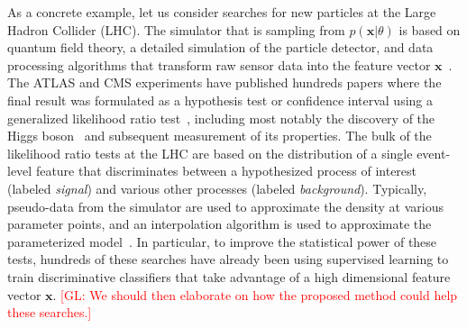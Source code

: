 \documentclass[12pt]{article}
\numberwithin{equation}{section}
\theoremstyle{plain}
\newcommand{\glnote}[1]{\textcolor{red}{[GL: #1]}}
\begin{document}
As a concrete example, let us consider searches for new particles at the Large
Hadron Collider (LHC). The simulator that is sampling from $p(\mathbf{x}|\theta)$ is
based on quantum field theory, a detailed simulation of the particle detector,
and data processing algorithms that transform raw sensor data into the feature
vector $\mathbf{x}$~\citep{Sjostrand:2006za,Agostinelli:2002hh}. The ATLAS and CMS
experiments have published  hundreds papers where the final result was
formulated as a hypothesis test or confidence interval using a generalized
likelihood ratio test~\citep{Cowan:2010js}, including most notably the discovery
of the Higgs boson~\citep{Aad:2012tfa,Chatrchyan:2012ufa} and subsequent
measurement of its properties. The bulk of the likelihood ratio tests at the LHC
are based on the distribution of a single event-level feature that discriminates
between a hypothesized process of interest (labeled \textit{signal}) and various
other processes (labeled \textit{background}). Typically, pseudo-data from the
simulator are used to approximate the density at various parameter points, and
an interpolation algorithm is used to approximate the parameterized
model~\citep{Cranmer:2012sba}. In particular, to improve the statistical power
of these tests, hundreds of these searches have already been using supervised
learning to train discriminative classifiers that take advantage of a high
dimensional feature vector $\mathbf{x}$. \glnote{We should then elaborate on how the
proposed method could help these searches.}
\end{document}
